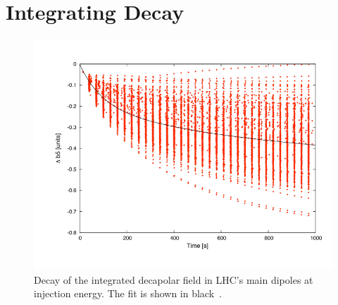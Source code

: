 \section{Integrating Decay}



\begin{figure}[H]
    \centering
    \includegraphics[width=\textwidth]{./images/decay_b5_mb.png}
    \caption{Decay of the integrated decapolar field in LHC's main dipoles at injection energy. The
    fit is shown in black~\cite{deniau_magnetic_2009}.}
    \label{fig:decapoles:decay_b5}
\end{figure}